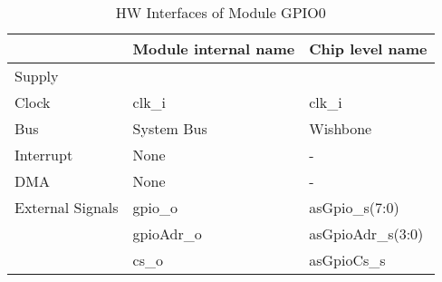 \begin{table}[H]
\caption{HW Interfaces of Module GPIO0}
\label{tab:asGpioPer02}
\centering
\begin{tabularx}{\textwidth}{|l |l |X|}
  \hline
   & Module internal name & Chip level name \\
  \hline
  \hline
  Supply &  &  \\
  \hline
  Clock & clk\_i & clk\_i \\
  \hline
  Bus & System Bus & Wishbone \\
  \hline
  Interrupt & None & - \\
  \hline
  DMA & None & - \\
  \hline
  External Signals & gpio\_o & asGpio\_s(7:0) \\
                   & gpioAdr\_o & asGpioAdr\_s(3:0) \\
                   & cs\_o & asGpioCs\_s \\
  \hline
\end{tabularx}
\end{table}
